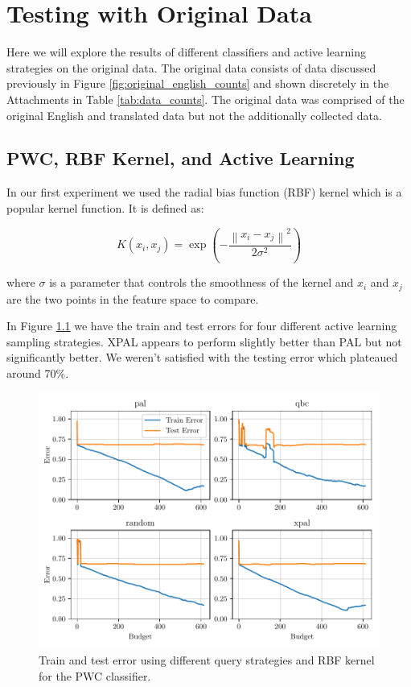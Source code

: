 \chapter{Testing with Original Data}

Here we will explore the results of different classifiers and active learning strategies on the original data. The original data consists of data discussed previously in Figure \ref{fig:original_english_counts} and shown discretely in the Attachments in Table \ref{tab:data_counts}. The original data was comprised of the original English and translated data but not the additionally collected data. 

\section{PWC, RBF Kernel, and Active Learning}

In our first experiment we used the radial bias function (RBF) kernel which is a popular kernel function. It is defined as:

\begin{equation}
    K(x_i, x_j) = \exp\left(- \frac{\left\| x_i - x_j \right\|^2}{2 \sigma^2}\right)
\label{eq:rbf_kernel}
\end{equation}

where $\sigma$ is a parameter that controls the smoothness of the kernel and $x_i$ and $x_j$ are the two points in the feature space to compare.

In Figure \ref{fig:plot_all_results_rbf} we have the train and test errors for four different active learning sampling strategies. XPAL appears to perform slightly better than PAL but not significantly better. We weren't satisfied with the testing error which plateaued around 70\%.

\begin{figure}[ht]
  \centering
  \includegraphics[width=\scale\textwidth]{../img/plot_all_results_rbf.pdf}
  \caption{Train and test error using different query strategies and RBF kernel for the PWC classifier.}
  \label{fig:plot_all_results_rbf}
\end{figure}

